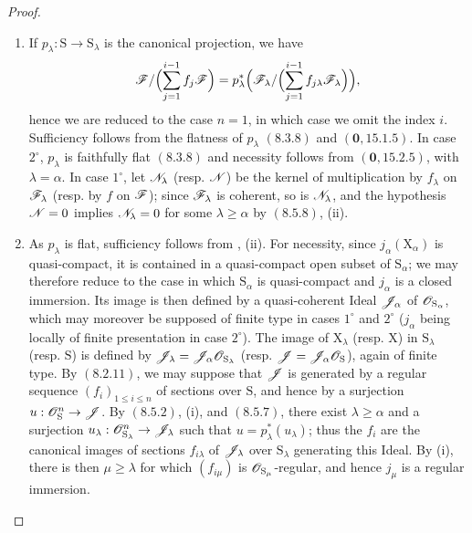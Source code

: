 \begin{proof}
\begin{enumerate}
\item[\rm(i)] If $p_\lambda:\mathrm{S}\to\mathrm{S}_\lambda$ is the canonical projection, we have
\[
  \mathscr{F}/\Bigl(\sum_{j=1}^{i-1}f_j\mathscr{F}\Bigr)
  =p_\lambda^*\Bigl(\mathscr{F}_\lambda/\Bigl(\sum_{j=1}^{i-1}f_{j\lambda}\mathscr{F}_\lambda\Bigr)\Bigr),
\]
hence we are reduced to the case $n=1$, in which case we omit the index $i$. Sufficiency follows from the flatness of $p_\lambda$ $(8.3.8)$ and $(\mathbf{0},15.1.5)$. In case $2^\circ$, $p_\lambda$ is faithfully flat $(8.3.8)$ and necessity follows from $(\mathbf{0},15.2.5)$, with $\lambda=\alpha$. In case $1^\circ$, let $\mathscr{N}_\lambda$ (resp. $\mathscr{N}$) be the kernel of multiplication by $f_\lambda$ on $\mathscr{F}_\lambda$ (resp. by $f$ on $\mathscr{F}$); since $\mathscr{F}_\lambda$ is coherent, so is $\mathscr{N}_\lambda$, and the hypothesis $\mathscr{N}=0$ implies $\mathscr{N}_\lambda=0$ for some $\lambda\geqslant\alpha$ by $(8.5.8)$, (ii).
\item[\rm(ii)] As $p_\lambda$ is flat, sufficiency follows from , (ii). For necessity, since $j_\alpha(\mathrm{X}_\alpha)$ is quasi-compact, it is contained in a quasi-compact open subset of $\mathrm{S}_\alpha$; we may therefore reduce to the case in which $\mathrm{S}_\alpha$ is quasi-compact and $j_\alpha$ is a closed immersion. Its image is then defined by a quasi-coherent Ideal $\mathscr{J}_\alpha$ of $\mathscr{O}_{\mathrm{S}_\alpha}$, which may moreover be supposed of finite type in cases $1^\circ$ and $2^\circ$ ($j_\alpha$ being locally of finite presentation in case $2^\circ$). The image of $\mathrm{X}_\lambda$ (resp. $\mathrm{X}$) in $\mathrm{S}_\lambda$ (resp. $\mathrm{S}$) is defined by $\mathscr{J}_\lambda=\mathscr{J}_\alpha\mathscr{O}_{\mathrm{S}_\lambda}$ (resp. $\mathscr{J}=\mathscr{J}_\alpha\mathscr{O}_\mathrm{S}$), again of finite type. By $(8.2.11)$, we may suppose that $\mathscr{J}$ is generated by a regular sequence $(f_i)_{1\leqslant i\leqslant n}$ of sections over $\mathrm{S}$, and hence by a surjection $u:\mathscr{O}_\mathrm{S}^n\to\mathscr{J}$. By $(8.5.2)$, (i), and $(8.5.7)$, there exist $\lambda\geqslant\alpha$ and a surjection $u_\lambda:\mathscr{O}_{\mathrm{S}_\lambda}^n\to\mathscr{J}_\lambda$ such that $u=p_\lambda^*(u_\lambda)$; thus the $f_i$ are the canonical images of sections $f_{i\lambda}$ of $\mathscr{J}_\lambda$ over $\mathrm{S}_\lambda$ generating this Ideal. By (i), there is then $\mu\geqslant\lambda$ for which $(f_{i\mu})$ is $\mathscr{O}_{\mathrm{S}_\mu}$-regular, and hence $j_\mu$ is a regular immersion.
\end{enumerate}
\end{proof}

